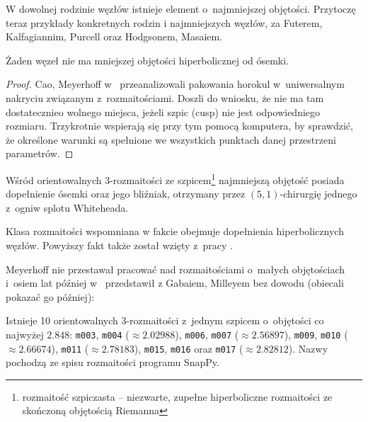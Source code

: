 W dowolnej rodzinie węzłów istnieje element o~najmniejszej objętości.
Przytoczę teraz przykłady konkretnych rodzin i najmniejszych węzłów, za Futerem, Kalfagiannim, Purcell \cite[s. 16-17]{purcell19} oraz Hodgsonem, Masaiem\cite[s. 1-99]{hodgson13}.
%
%
%
%
%

\begin{proposition}
    Żaden węzeł nie ma mniejszej objętości hiperbolicznej od ósemki.
\end{proposition}

\begin{proof}
    Cao, Meyerhoff w~\cite{cao01} przeanalizowali pakowania horokul w~uniwersalnym nakryciu związanym z~rozmaitościami.
    Doszli do wniosku, że nie ma tam dostatecznieo wolnego miejsca, jeżeli szpic (cusp) nie jest odpowiedniego rozmiaru.
    Trzykrotnie wspierają się przy tym pomocą komputera, by sprawdzić, że określone warunki są spełnione we wszystkich punktach danej przestrzeni parametrów.
\end{proof}

\begin{proposition}
%
%
    Wśród orientowalnych 3-rozmaitości ze szpicem\footnote{rozmaitość szpiczasta -- niezwarte, zupełne hiperboliczne rozmaitości ze skończoną objętością Riemanna} najmniejszą objętość posiada dopełnienie ósemki oraz jego bliźniak, otrzymany przez $(5, 1)$-chirurgię jednego z~ogniw splotu Whiteheada.
\end{proposition}

Klasa rozmaitości wspomniana w fakcie obejmuje dopełnienia hiperbolicznych węzłów.
Powyższy fakt także został wzięty z~pracy \cite{cao01}.

Meyerhoff nie przestawał pracować nad rozmaitościami o~małych objętościach i~osiem lat później w~\cite{meyerhoff09} przedstawił z Gabaiem, Milleyem bez dowodu (obiecali pokazać go później):

\begin{proposition}
    Istnieje 10 orientowalnych 3-rozmaitości z~jednym szpicem o~objętości co najwyżej $2.848$: \texttt{m003}, \texttt{m004} ($\approx 2.02988$), \texttt{m006}, \texttt{m007} ($\approx 2.56897$), \texttt{m009}, \texttt{m010} ($\approx 2.66674$), \texttt{m011} ($\approx 2.78183$), \texttt{m015}, \texttt{m016} oraz \texttt{m017} ($\approx 2.82812$).
    Nazwy pochodzą ze spisu rozmaitości programu SnapPy.
\end{proposition}

